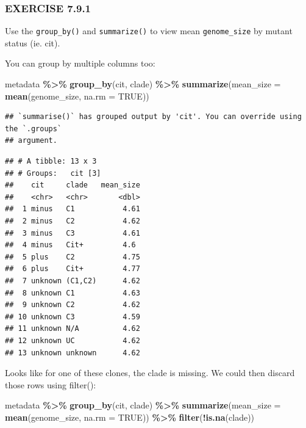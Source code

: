 \documentclass[
]{book}
\newenvironment{Shaded}{\begin{snugshade}}{\end{snugshade}}
\newcommand{\AttributeTok}[1]{\textcolor[rgb]{0.13,0.29,0.53}{#1}}
\newcommand{\ConstantTok}[1]{\textcolor[rgb]{0.56,0.35,0.01}{#1}}
\newcommand{\FunctionTok}[1]{\textcolor[rgb]{0.13,0.29,0.53}{\textbf{#1}}}
\newcommand{\NormalTok}[1]{#1}
\newcommand{\SpecialCharTok}[1]{\textcolor[rgb]{0.81,0.36,0.00}{\textbf{#1}}}
\begin{document}
\subsubsection*{EXERCISE 7.9.1}\label{exercise-7.9.1}

Use the \texttt{group\_by()} and \texttt{summarize()} to view mean \texttt{genome\_size} by mutant status (ie. cit).

You can group by multiple columns too:

\begin{Shaded}
\begin{Highlighting}[]
\NormalTok{metadata }\SpecialCharTok{\%\textgreater{}\%}
  \FunctionTok{group\_by}\NormalTok{(cit, clade) }\SpecialCharTok{\%\textgreater{}\%}
  \FunctionTok{summarize}\NormalTok{(}\AttributeTok{mean\_size =} \FunctionTok{mean}\NormalTok{(genome\_size, }\AttributeTok{na.rm =} \ConstantTok{TRUE}\NormalTok{))}
\end{Highlighting}
\end{Shaded}

\begin{verbatim}
## `summarise()` has grouped output by 'cit'. You can override using the `.groups`
## argument.
\end{verbatim}

\begin{verbatim}
## # A tibble: 13 x 3
## # Groups:   cit [3]
##    cit     clade   mean_size
##    <chr>   <chr>       <dbl>
##  1 minus   C1           4.61
##  2 minus   C2           4.62
##  3 minus   C3           4.61
##  4 minus   Cit+         4.6 
##  5 plus    C2           4.75
##  6 plus    Cit+         4.77
##  7 unknown (C1,C2)      4.62
##  8 unknown C1           4.63
##  9 unknown C2           4.62
## 10 unknown C3           4.59
## 11 unknown N/A          4.62
## 12 unknown UC           4.62
## 13 unknown unknown      4.62
\end{verbatim}

Looks like for one of these clones, the clade is missing. We could then discard those rows using filter():

\begin{Shaded}
\begin{Highlighting}[]
\NormalTok{metadata }\SpecialCharTok{\%\textgreater{}\%}
  \FunctionTok{group\_by}\NormalTok{(cit, clade) }\SpecialCharTok{\%\textgreater{}\%}
  \FunctionTok{summarize}\NormalTok{(}\AttributeTok{mean\_size =} \FunctionTok{mean}\NormalTok{(genome\_size, }\AttributeTok{na.rm =} \ConstantTok{TRUE}\NormalTok{)) }\SpecialCharTok{\%\textgreater{}\%}
  \FunctionTok{filter}\NormalTok{(}\SpecialCharTok{!}\FunctionTok{is.na}\NormalTok{(clade))}
\end{Highlighting}
\end{Shaded}
\end{document}
